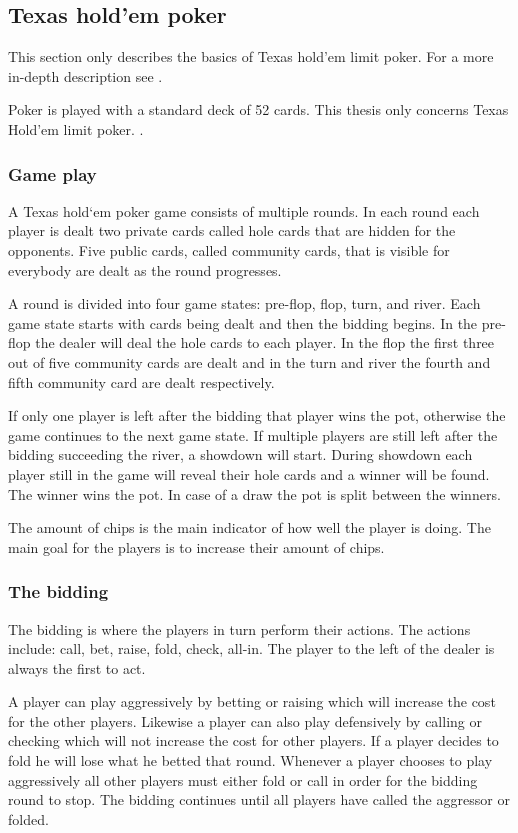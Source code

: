 \subsection*{Texas hold'em poker}
This section only describes the basics of Texas hold'em limit poker. For a more in-depth description see \cite{poker-rules}. 

Poker is played with a standard deck of 52 cards. This thesis only concerns Texas Hold'em limit poker. \cite{poker-rules}.

\subsubsection*{Game play}
A Texas hold`em poker game consists of multiple rounds. In each round each player is dealt two private cards called hole cards that are hidden for the opponents. Five public cards, called community cards, that is visible for everybody are dealt as the round progresses. 

A round is divided into four game states: pre-flop, flop, turn, and river. Each game state starts with cards being dealt and then the bidding begins. In the pre-flop the dealer will deal the hole cards to each player. In the flop the first three out of five community cards are dealt and in the turn and river the fourth and fifth community card are dealt respectively. 

If only one player is left after the bidding that player wins the pot, otherwise the game continues to the next game state. If multiple players are still left after the bidding succeeding the river, a showdown will start. During showdown each player still in the game will reveal their hole cards and a winner will be found. The winner wins the pot. In case of a draw the pot is split between the winners.

The amount of chips is the main indicator of how well the player is doing. The main goal for the players is to increase their amount of chips.

\subsubsection*{The bidding}
The bidding is where the players in turn perform their actions. The actions include: call, bet, raise, fold, check, all-in. The player to the left of the dealer is always the first to act.

A player can play aggressively by betting or raising which will increase the cost for the other players. Likewise a player can also play defensively by calling or checking which will not increase the cost for other players. If a player decides to fold he will lose what he betted that round. Whenever a player chooses to play aggressively all other players must either fold or call in order for the bidding round to stop. The bidding continues until all players have called the aggressor or folded.

